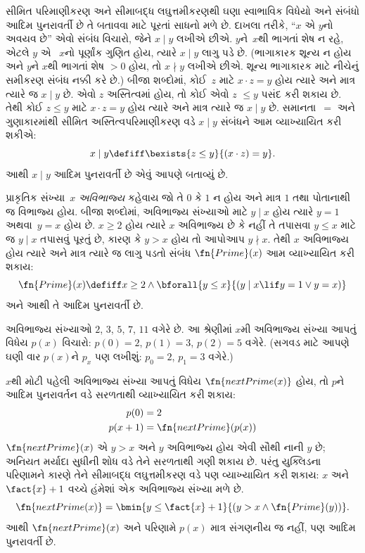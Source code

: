 સીમિત પરિમાણીકરણ અને સીમાબદ્ધ લઘુત્તમીકરણથી ઘણા સ્વાભાવિક વિધેયો
અને સંબંધો આદિમ પુનરાવર્તી છે તે બતાવવા માટે પૂરતાં સાધનો મળે છે.
દાખલા તરીકે, ``$x$ એ $y$નો અવયવ છે'' એવો સંબંધ વિચારો, જેને
$x \mid y$ લખીએ છીએ. $y$ને~$x$થી ભાગતાં શેષ ન રહે, એટલે $y$ એ
~$x$નો પૂર્ણાંક ગુણિત હોય, ત્યારે $x \mid y$ લાગુ પડે છે. (ભાગાકારક
શૂન્ય ન હોય અને $y$ને $x$થી ભાગતાં શેષ $> 0$ હોય, તો $x \nmid y$
લખીએ છીએ. શૂન્ય ભાગાકારક માટે નીચેનું સમીકરણ સંબંધ નક્કી કરે છે.)
બીજા શબ્દોમાં, કોઈ~$z$ માટે $x \cdot z = y$ હોય
ત્યારે અને માત્ર ત્યારે જ $x \mid y$ છે. એવો $z$ અસ્તિત્વમાં
હોય, તો કોઈ એવો $z$ $\leq y$ પસંદ કરી શકાય છે. તેથી કોઈ
$z \le y$ માટે $x \cdot z = y$ હોય ત્યારે અને માત્ર ત્યારે જ
$x \mid y$ છે. સમાનતા~$=$ અને ગુણાકારમાંથી સીમિત
અસ્તિત્વપરિમાણીકરણ વડે $x \mid y$ સંબંધને આમ વ્યાખ્યાયિત કરી
શકીએ:
\[
x \mid y \defiff \bexists{z \leq y}{(x \cdot z) = y}.
\]
આથી $x \mid y$ આદિમ પુનરાવર્તી છે એવું આપણે બતાવ્યું છે.


પ્રાકૃતિક સંખ્યા~$x$ \emph{અવિભાજ્ય} કહેવાય જો તે $0$ કે $1$
ન હોય અને માત્ર $1$ તથા પોતાનાથી જ વિભાજ્ય હોય. બીજા શબ્દોમાં,
અવિભાજ્ય સંખ્યાઓ માટે $y \mid x$ હોય ત્યારે $y = 1$ અથવા~$y=x$
હોય છે. $x\geq 2$ હોય ત્યારે $x$ અવિભાજ્ય છે કે નહીં તે તપાસવા $y \le x$ માટે જ
$y \mid x$ તપાસવું પૂરતું છે, કારણ કે $y > x$ હોય તો આપોઆપ
$y \nmid x$. તેથી $x$ અવિભાજ્ય હોય ત્યારે અને માત્ર ત્યારે જ
લાગુ પડતો સંબંધ $\fn{Prime}(x)$ આમ વ્યાખ્યાયિત કરી શકાય:
\[
\fn{Prime}(x) \defiff x \geq 2 \land \bforall{y \leq x}{(y \mid x \lif y
  = 1 \lor y = x)}
\]
અને આથી તે આદિમ પુનરાવર્તી છે.

અવિભાજ્ય સંખ્યાઓ $2$, $3$, $5$, $7$, $11$ વગેરે છે. આ શ્રેણીમાં
$x$મી અવિભાજ્ય સંખ્યા આપતું વિધેય $p(x)$ વિચારો: $p(0) =
2$, $p(1) = 3$, $p(2) = 5$ વગેરે. (સગવડ માટે આપણે ઘણી વાર
$p(x)$ને $p_x$ પણ લખીશું: $p_0=2$, $p_1=3$ વગેરે.)

$x$થી મોટી પહેલી અવિભાજ્ય સંખ્યા આપતું વિધેય
$\fn{nextPrime(x)}$ હોય, તો $p$ને આદિમ પુનરાવર્તન વડે સરળતાથી
વ્યાખ્યાયિત કરી શકાય:
\begin{align*}
  p(0) & = 2\\
  p(x+1) & = \fn{nextPrime}(p(x))
\end{align*}
$\fn{nextPrime}(x)$ એ $y > x$ અને $y$ અવિભાજ્ય હોય એવી સૌથી
નાની $y$ છે; અનિયત મર્યાદા સુધીની શોધ વડે તેને સરળતાથી ગણી
શકાય છે. પરંતુ યુક્લિડના પરિણામને કારણે તેને સીમાબદ્ધ
લઘુત્તમીકરણ વડે પણ વ્યાખ્યાયિત કરી શકાય: $x$ અને $\fact{x}+1$
વચ્ચે હંમેશાં એક અવિભાજ્ય સંખ્યા મળે છે.
\[
  \fn{nextPrime(x)} =
  \bmin{y \leq \fact{x}+1}{(y > x \land \fn{Prime}(y))}.
\]
આથી $\fn{nextPrime}(x)$ અને પરિણામે $p(x)$ માત્ર સંગણનીય જ નહીં,
પણ આદિમ પુનરાવર્તી છે.

